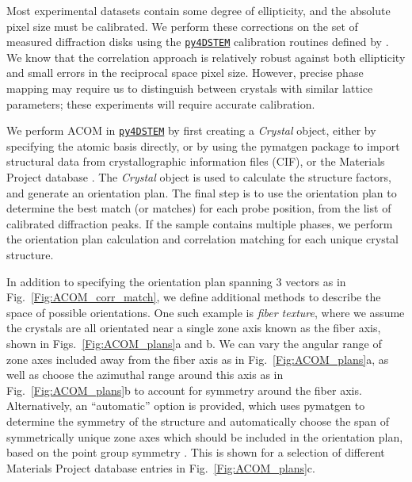 \documentclass[%
 superscriptaddress,
 aip,
 amsmath,amssymb,
reprint,%
 author-year,%
longbibliography
]{revtex4-2}
\newcommand{\pyFDSTEM}{\href{https://github.com/py4dstem/py4DSTEM}{\texttt{py4DSTEM}}}
\begin{document}
Most experimental datasets contain some degree of ellipticity, and the absolute pixel size must be calibrated. We perform these corrections on the set of measured diffraction disks using the \pyFDSTEM{} calibration routines defined by \cite{savitzky2021py4dstem}. We know that the correlation approach is relatively robust against both ellipticity and small errors in the reciprocal space pixel size. However, precise phase mapping may require us to distinguish between crystals with similar lattice parameters; these experiments will require accurate calibration.

We perform ACOM in \pyFDSTEM{} by first creating a \emph{Crystal} object, either by specifying the atomic basis directly, or by using the pymatgen package \citep{ong2013python} to import structural data from crystallographic  information files (CIF), or the Materials Project database \citep{jain2013commentary}. The \emph{Crystal} object is used to calculate the structure factors, and generate an orientation plan. The final step is to use the orientation plan to determine the best match (or matches) for each probe position, from the list of calibrated diffraction peaks.  If the sample contains multiple phases, we perform the orientation plan calculation and correlation matching for each unique crystal structure.


In addition to specifying the orientation plan spanning 3 vectors as in Fig.~\ref{Fig:ACOM_corr_match}, we define additional methods to describe the space of possible orientations. One such example is \emph{fiber texture}, where we assume the crystals are all orientated near a single zone axis known as the fiber axis, shown in Figs.~\ref{Fig:ACOM_plans}a and b. We can vary the angular range of zone axes included away from the fiber axis as in Fig.~\ref{Fig:ACOM_plans}a, as well as choose the azimuthal range around this axis as in Fig.~\ref{Fig:ACOM_plans}b to account for symmetry around the fiber axis. Alternatively, an ``automatic'' option is provided, which uses pymatgen to determine the symmetry of the structure and automatically choose the span of symmetrically unique zone axes which should be included in the orientation plan, based on the point group symmetry \cite{de2003introduction}. This is shown for a selection of different Materials Project database entries in Fig.~\ref{Fig:ACOM_plans}c.
\end{document}
